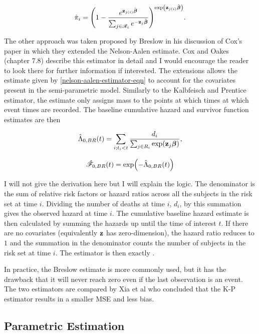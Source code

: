 \begin{equation}
    \hat{\pi}_i = \Bigg(1-\frac{e^{\textbf{z}_{j(i)}\hat{\boldsymbol{\beta}}}}{\sum_{j\in\mathscr{R}_i}e^{-\textbf{z}_j\hat{\boldsymbol{\beta}}}}\Bigg)^{\exp(\textbf{z}_{j(i)}\hat{\boldsymbol{\beta}})}.
\end{equation}

The other approach was taken proposed by Breslow in his discussion of Cox's paper in which they extended the Nelson-Aalen estimate. Cox and Oakes  (chapter 7.8) describe this estimator in detail and I would encourage the reader to look there for further information if interested. The extensions allows the estimate given by \ref{nelson-aalen-estimator-eqn} to account for the covariates present in the semi-parametric model. Similarly to the Kalbfeisch and Prentice estimator, the estimate only assigns mass to the points at which times at which event times are recorded. The baseline cumulative hazard and survivor function estimates are then

\begin{equation}
    \hat{\Lambda}_{0,BR}(t)=\sum_{i;t_i<t}\frac{d_i}{\sum_{j\in R_i} \exp(
\textbf{z}_j\boldsymbol{\beta})},
\end{equation}

\begin{equation}
    \hat{\mathscr{F}}_{0,BR}(t)=\exp(-\hat{\Lambda}_{0,BR}(t))
\end{equation}

I will not give the derivation here but I will explain the logic. The denominator is the sum of relative risk factors or hazard ratios across all the subjects in the risk set at time $i$. Dividing the number of deaths at time $i$, $d_i$, by this summation gives the observed hazard at time $i$. The cumulative baseline hazard estimate is then calculated by summing the hazards up until the time of interest $t$. If there are no covariates (equivalently $\textbf{z}$ has zero-dimension), the hazard ratio reduces to $1$ and the summation in the denominator counts the number of subjects in the risk set at time $i$. The estimator is then exactly .

In practice, the Breslow estimate is more commonly used, but it has the drawback that it will never reach zero even if the last observation is an event. The two estimators are compared by Xia et al  who concluded that the K-P estimator results in a smaller MSE and less bias. 

\subsection{Parametric Estimation}

